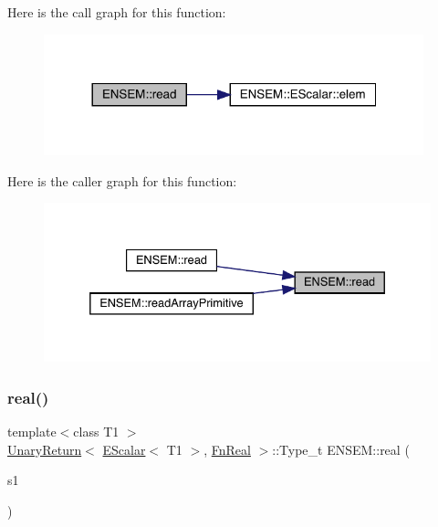 Here is the call graph for this function\+:
\nopagebreak
\begin{figure}[H]
\begin{center}
\leavevmode
\includegraphics[width=312pt]{d4/dca/group__escalar_ga5631206e233cf75b5fb2ff13ee8b77ac_cgraph}
\end{center}
\end{figure}
Here is the caller graph for this function\+:
\nopagebreak
\begin{figure}[H]
\begin{center}
\leavevmode
\includegraphics[width=332pt]{d4/dca/group__escalar_ga5631206e233cf75b5fb2ff13ee8b77ac_icgraph}
\end{center}
\end{figure}
\mbox{\label{group__escalar_gae1f319d978abc1631bd68382787544aa}} 
\subsubsection{\texorpdfstring{real()}{real()}}
{\footnotesize\ttfamily template$<$class T1 $>$ \\
\mbox{\hyperlink{structENSEM_1_1UnaryReturn}{Unary\+Return}}$<$ \mbox{\hyperlink{classENSEM_1_1EScalar}{E\+Scalar}}$<$ T1 $>$, \mbox{\hyperlink{structENSEM_1_1FnReal}{Fn\+Real}} $>$\+::Type\+\_\+t E\+N\+S\+E\+M\+::real (\begin{DoxyParamCaption}\item[{const \mbox{\hyperlink{classENSEM_1_1EScalar}{E\+Scalar}}$<$ T1 $>$ \&}]{s1 }\end{DoxyParamCaption})\hspace{0.3cm}{\ttfamily [inline]}}

